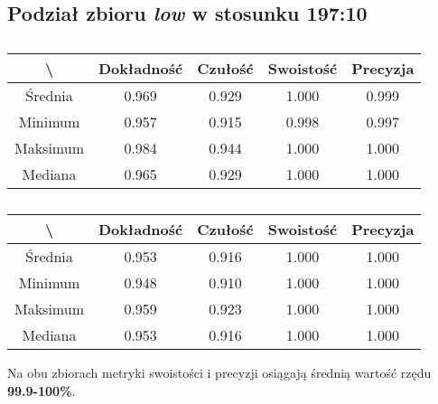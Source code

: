 \subsection{Podział zbioru \textit{low} w stosunku 197:10}


\begin{table}[H]
	\centering
	\caption{}
	\vspace{6pt}
	{\footnotesize
		\begin{tabular}{|c|c|c|c|c|}
      \hline \textbackslash & Dokładność & Czułość & Swoistość & Precyzja \\
      \hline Średnia & 0.969 & 0.929 & 1.000 & 0.999 \\
      \hline Minimum & 0.957 & 0.915 & 0.998 & 0.997 \\
      \hline Maksimum & 0.984 & 0.944 & 1.000 & 1.000 \\
      \hline Mediana & 0.965 & 0.929 & 1.000 & 1.000 \\
      \hline
    \end{tabular}
    \label{Tab:lowsplita_val}
	}
	\vspace{0pt}
\end{table}

\begin{table}[H]
	\centering
	\caption{}
	\vspace{6pt}
	{\footnotesize
		\begin{tabular}{|c|c|c|c|c|}
      \hline \textbackslash & Dokładność & Czułość & Swoistość & Precyzja \\
      \hline Średnia & 0.953 & 0.916 & 1.000 & 1.000 \\
      \hline Minimum & 0.948 & 0.910 & 1.000 & 1.000 \\
      \hline Maksimum & 0.959 & 0.923 & 1.000 & 1.000 \\
      \hline Mediana & 0.953 & 0.916 & 1.000 & 1.000 \\
      \hline
    \end{tabular}
    \label{Tab:lowsplita_test}
	}
	\vspace{0pt}
\end{table}

Na obu zbiorach metryki swoistości i precyzji osiągają średnią wartość rzędu \textbf{99.9-100\%}.
